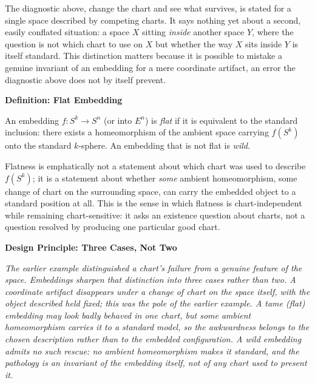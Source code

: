 \documentclass[11pt,fleqn]{book}
\numberwithin{equation}{chapter}
\newenvironment{definition}[1]
  {\begin{definitionEnv}
   \noindent\textbf{Definition: #1}\par\smallskip}
  {\end{definitionEnv}}
\newenvironment{principle}[1]
  {\begin{principleEnv}
   \noindent\textbf{Design Principle: #1}\par\smallskip\itshape}
  {\end{principleEnv}}
\theoremstyle{plain}
\theoremstyle{definition}
\theoremstyle{remark}
\begin{document}
The diagnostic above, change the chart and see what survives, is stated for a single space described by competing charts. It says nothing yet about a second, easily conflated situation: a space \(X\) sitting \emph{inside} another space \(Y\), where the question is not which chart to use on \(X\) but whether the way \(X\) sits inside \(Y\) is itself standard. This distinction matters because it is possible to mistake a genuine invariant of an embedding for a mere coordinate artifact, an error the diagnostic above does not by itself prevent.

\begin{definition}{Flat Embedding}
An embedding \(f:S^k\to S^n\) (or into \(E^n\)) is \emph{flat} if it is equivalent to the standard inclusion: there exists a homeomorphism of the ambient space carrying \(f(S^k)\) onto the standard \(k\)-sphere. An embedding that is not flat is \emph{wild}.
\end{definition}

Flatness is emphatically not a statement about which chart was used to describe \(f(S^k)\); it is a statement about whether \emph{some} ambient homeomorphism, some change of chart on the surrounding space, can carry the embedded object to a standard position at all. This is the sense in which flatness is chart-independent while remaining chart-sensitive: it asks an existence question about charts, not a question resolved by producing one particular good chart.

\begin{principle}{Three Cases, Not Two}
The earlier example distinguished a chart's failure from a genuine feature of the space. Embeddings sharpen that distinction into three cases rather than two. A \emph{coordinate artifact} disappears under a change of chart on the space itself, with the object described held fixed; this was the pole of the earlier example. A \emph{tame (flat) embedding} may look badly behaved in one chart, but some ambient homeomorphism carries it to a standard model, so the awkwardness belongs to the chosen description rather than to the embedded configuration. A \emph{wild embedding} admits no such rescue: no ambient homeomorphism makes it standard, and the pathology is an invariant of the embedding itself, not of any chart used to present it.
\end{principle}
\end{document}
